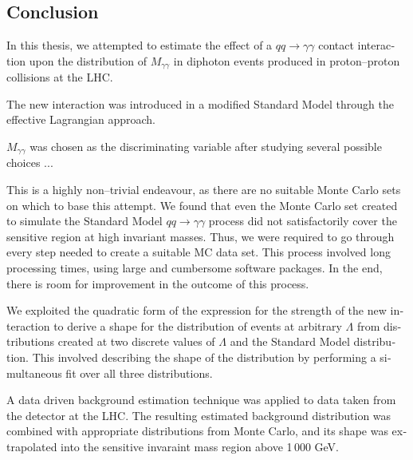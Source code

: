 






\begin{english}












\chapter{Conclusion}
In this thesis, we attempted to estimate the effect of a $qq\rightarrow\gamma\gamma$ contact interaction upon the distribution of $M_{\gamma\gamma}$ in diphoton events produced in proton--proton collisions at the LHC.

The new interaction was introduced in a modified Standard Model through the effective Lagrangian approach.

$M_{\gamma\gamma}$ was chosen as the discriminating variable after studying several possible choices ...

This is a highly non--trivial endeavour, as there are no suitable \atlas{} Monte Carlo sets on which to base this attempt. We found that even the Monte Carlo set created to simulate the Standard Model $qq\rightarrow\gamma\gamma$ process did not satisfactorily cover the sensitive region at high invariant masses. Thus, we were required to go through every step needed to create a suitable MC data set. This process involved long processing times, using large and cumbersome software packages. In the end, there is room for improvement in the outcome of this process.

We exploited the quadratic form of the expression for the strength of the new interaction to derive a shape for the distribution of events at arbitrary $\Lambda$ from distributions created at two discrete values of $\Lambda$ and the Standard Model distribution. This involved describing the shape of the distribution by performing a simultaneous fit over all three distributions.

A data driven background estimation technique was applied to data taken from the \atlas{} detector at the LHC. The resulting estimated background distribution was combined with appropriate distributions from Monte Carlo, and its shape was extrapolated into the sensitive invaraint mass region above 1\,000 GeV.


\end{english}

